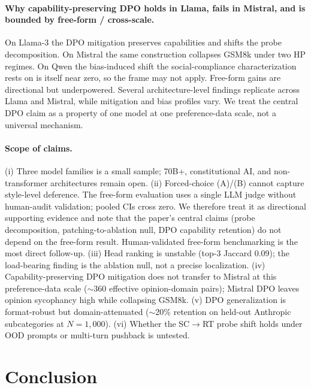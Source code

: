 \documentclass{article}
\begin{document}
\paragraph{Why capability-preserving DPO holds in Llama, fails in Mistral, and is bounded by free-form / cross-scale.}
On Llama-3 the DPO mitigation preserves capabilities and shifts the probe decomposition. On Mistral the same construction collapses GSM8k under two HP regimes. On Qwen the bias-induced shift the social-compliance characterization rests on is itself near zero, so the frame may not apply. Free-form gains are directional but underpowered. Several architecture-level findings replicate across Llama and Mistral, while mitigation and bias profiles vary. We treat the central DPO claim as a property of one model at one preference-data scale, not a universal mechanism.

\paragraph{Scope of claims.}
(i) Three model families is a small sample; 70B+, constitutional AI, and non-transformer architectures remain open. (ii) Forced-choice (A)/(B) cannot capture style-level deference. The free-form evaluation uses a single LLM judge without human-audit validation; pooled CIs cross zero. We therefore treat it as directional supporting evidence and note that the paper's central claims (probe decomposition, patching-to-ablation null, DPO capability retention) do not depend on the free-form result. Human-validated free-form benchmarking is the most direct follow-up. (iii) Head ranking is unstable (top-3 Jaccard 0.09); the load-bearing finding is the ablation null, not a precise localization. (iv) Capability-preserving DPO mitigation does not transfer to Mistral at this preference-data scale ($\sim$360 effective opinion-domain pairs); Mistral DPO leaves opinion sycophancy high while collapsing GSM8k. (v) DPO generalization is format-robust but domain-attenuated ($\sim$20\% retention on held-out Anthropic subcategories at $N{=}1{,}000$). (vi) Whether the SC$\to$RT probe shift holds under OOD prompts or multi-turn pushback is untested.

\section{Conclusion}
\label{sec:conclusion}
\end{document}
